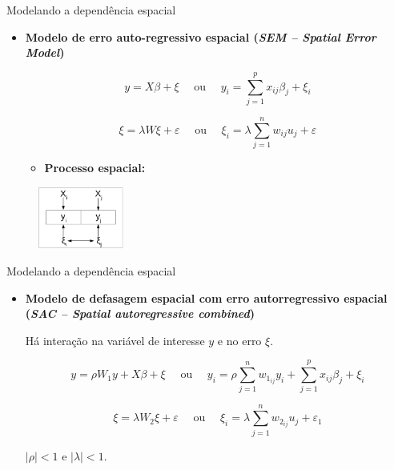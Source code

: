 \documentclass[aspectratio=169]{beamer}
\begin{document}
\begin{frame}{Modelando a dependência espacial}
    \begin{itemize}
        \item \textbf{Modelo de erro auto-regressivo espacial (\textit{SEM -- Spatial Error Model})}
        \vspace{0.5cm}
        \begin{block}{}
            $$y = X\beta+ \xi \quad \text{ ou }\quad  y_i = \sum_{j=1}^{p} x_{ij}\beta_j + \xi_i$$  
            
            $$\xi = \lambda W \xi + \varepsilon \quad \text{ ou }\quad  \xi_i = \lambda \sum_{j=1}^{n} w_{ij} u_j + \varepsilon$$
        \end{block}
        \noindent 
        \begin{itemize}
            \item \textbf{Processo espacial:}
        \end{itemize}
    \end{itemize}
    \begin{figure}
		\centering
		\includegraphics[width=0.25\textwidth]{img/reg_sem.png}
	\end{figure}
\end{frame}

\begin{frame}{Modelando a dependência espacial}
    \begin{itemize}
        \item \textbf{Modelo de defasagem espacial com erro autorregressivo espacial (\textit{SAC -- Spatial autoregressive combined})}
        
        \vspace{0.2cm}
        Há interação na variável de interesse $y$ e no erro $\xi$.
        \begin{block}{}
            $$y = \rho W_1y +  X\beta+ \xi \quad \text{ ou }\quad y_i = \rho \sum_{j=1}^{n} w_{1_{ij}} y_i + \sum_{j=1}^{p} x_{ij}\beta_j + \xi_i$$  
            
            $$\xi = \lambda W_2 \xi + \varepsilon \quad \text{ ou }\quad \xi_i = \lambda  \sum_{j=1}^{n} w_{2_{ij}} u_j + \varepsilon_1$$
        \end{block}
        \noindent $|\rho|<1$ e $|\lambda|<1$. 
    \end{itemize}
\end{frame}
\end{document}
